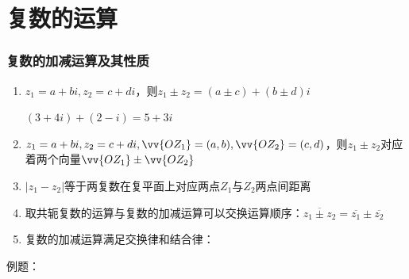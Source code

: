 \section*{复数的运算}
\subsubsection*{复数的加减运算及其性质}
\begin{enumerate}
    \item $z_1 = a+bi, z_2 = c+di$，则$z_1 \pm z_2 = (a \pm c) + (b \pm d)i$
    \begin{example}
        $(3+4i) + (2-i) = 5+3i$
    \end{example}
    \item $z_1 = a+bi, z_2 = c+di, \vv{OZ_1} = (a, b), \vv{OZ_2} = (c, d)$，则$z_1 \pm z_2$对应着两个向量$\vv{OZ_1} \pm \vv{OZ_2}$
    \item $|z_1 - z_2|$等于两复数在复平面上对应两点$Z_1$与$Z_2$两点间距离
    \item 取共轭复数的运算与复数的加减运算可以交换运算顺序：$\overline{z_1 \pm z_2} = \overline{z_1} \pm \overline{z_2}$
    \item 复数的加减运算满足交换律和结合律：
\end{enumerate}
例题：
